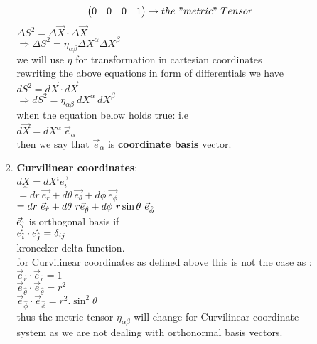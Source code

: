 \documentclass[11pt,a4paper]{article}
\begin{document}
\begin{enumerate}
\begin{enumerate}
\begin{enumerate}
\[\begin{pmatrix}
                                      0  & 0 & 0 & 1 \\\end{pmatrix} \rightarrow the\ "metric"\ Tensor \]
                              $\Delta{S^2} = \Delta \vec{X} \cdot \Delta\vec{X}$\\
                              $\Rightarrow \Delta{S^2} = {\displaystyle{\eta_{\alpha\beta}}} \Delta X^{\alpha} \Delta X^{\beta}$\\
                              we will use $\eta$ for transformation in cartesian coordinates\\
                              rewriting the above equations in form of differentials we have\\
                              $d{S^2} = d \vec{X} \cdot d\vec{X}$\\
                              $\Rightarrow d {S^2} = {\displaystyle{\eta_{\alpha\beta}}}\ d X^{\alpha}\ d X^{\beta}$\\

                              when the equation below holds true: i.e\\
                              $d\vec{X}= dX^{\alpha}\ \vec{e}_{\alpha}$\\
                              then we say that $\vec{e}_{\alpha}$ is \textbf{coordinate basis} vector.
                        \item \textbf{Curvilinear coordinates}:\\
                              $d\underset{\sim}{X} = dX^i \vec{e_i}$\\
                              $= d{r}\ \vec{e_r} + d\theta\ \vec{e_{\theta}} +d\phi\ \vec{e_{\phi}} $\\
                              $= d{r}\ \vec{e}_{\hat{r}} + d\theta\ r \vec{e}_{\hat{\theta}} +d\phi\ r \sin\theta\ \vec{e}_{\Hat{\phi}} $\\
                             
                              $\vec{e}_{\Hat{i}}$ is orthogonal basis if \\
                              $\vec{e}_{\Hat{i}}\cdot \vec{e}_{\Hat{j}} = \delta_{ij}$\\
                              kronecker delta function.\\
                              for Curvilinear coordinates as defined above this is not the case as :\\
                              $\vec{e}_{\hat{r}} \cdot \vec{e}_{\hat{r}} = 1 $\\ 
                              $\vec{e}_{\hat{\theta}} \cdot \vec{e}_{\hat{\theta}} = r^2 $\\ 
                              $\vec{e}_{\hat{\phi}} \cdot \vec{e}_{\hat{\phi}} = r^2.\sin^2\theta $\\ 
                              thus the metric tensor ${\displaystyle{\eta_{\alpha\beta}}}$ will change for Curvilinear coordinate system as we are not dealing with orthonormal basis vectors.


\end{enumerate}
\end{enumerate}
\end{enumerate}
\end{document}
